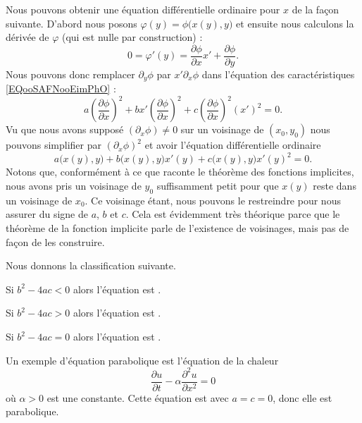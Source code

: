 Nous pouvons obtenir une équation différentielle ordinaire pour \( x\) de la façon suivante. D'abord nous posons \( \varphi(y)=\phi\big( x(y),y \big)\) et ensuite nous calculons la dérivée de \( \varphi\) (qui est nulle par construction) :
\begin{equation}
    0=\varphi'(y)=\frac{ \partial \phi }{ \partial x }x'+\frac{ \partial \phi }{ \partial y }.
\end{equation}
Nous pouvons donc remplacer \( \partial_y\phi\) par \( x'\partial_x\phi\) dans l'équation des caractéristiques \eqref{EQooSAFNooEimPhO} :
\begin{equation}
    a\left( \frac{ \partial \phi }{ \partial x } \right)^2+bx'\left( \frac{ \partial \phi }{ \partial x } \right)^2+c\left( \frac{ \partial \phi }{ \partial x } \right)^2(x')^2=0.
\end{equation}
Vu que nous avons supposé \( (\partial_x\phi)\neq 0\) sur un voisinage de \( (x_0,y_0)\) nous pouvons simplifier par \( (\partial_x\phi)^2\) et avoir l'équation différentielle ordinaire
\begin{equation}
    a\big( x(y),y \big)+b\big( x(y),y \big)x'(y)+c\big( x(y),y \big)x'(y)^2=0.
\end{equation}
Notons que, conformément à ce que raconte le théorème des fonctions implicites, nous avons pris un voisinage de \( y_0\) suffisamment petit pour que \( x(y)\) reste dans un voisinage de \( x_0\). Ce voisinage étant, nous pouvons le restreindre pour nous assurer du signe de \( a\), \( b\) et \( c\). Cela est évidemment très théorique parce que le théorème de la fonction implicite parle de l'existence de voisinages, mais pas de façon de les construire.

Nous donnons la classification suivante.

\begin{definition}
    Si \( b^2-4ac<0\) alors l'équation est .

    Si \( b^2-4ac>0\) alors l'équation est .

    Si \( b^2-4ac=0\) alors l'équation est .
\end{definition}

\begin{example}
    Un exemple d'équation parabolique est l'équation de la chaleur
    \begin{equation}
        \frac{ \partial u }{ \partial t }-\alpha\frac{ \partial^2u }{ \partial x^2 }=0
    \end{equation}
    où \( \alpha>0\) est une constante. Cette équation est avec \( a=c=0\), donc elle est parabolique. 
\end{example}

